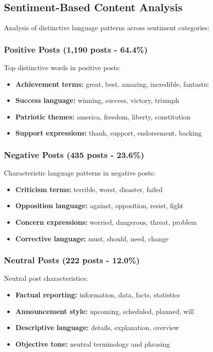 \documentclass[12pt,a4paper]{article}
\begin{document}
\subsection{Sentiment-Based Content Analysis}

Analysis of distinctive language patterns across sentiment categories:

\subsubsection{Positive Posts (1,190 posts - 64.4\%)}

Top distinctive words in positive posts:
\begin{itemize}
\item \textbf{Achievement terms:} great, best, amazing, incredible, fantastic
\item \textbf{Success language:} winning, success, victory, triumph
\item \textbf{Patriotic themes:} america, freedom, liberty, constitution
\item \textbf{Support expressions:} thank, support, endorsement, backing
\end{itemize}

\subsubsection{Negative Posts (435 posts - 23.6\%)}

Characteristic language patterns in negative posts:
\begin{itemize}
\item \textbf{Criticism terms:} terrible, worst, disaster, failed
\item \textbf{Opposition language:} against, opposition, resist, fight
\item \textbf{Concern expressions:} worried, dangerous, threat, problem
\item \textbf{Corrective language:} must, should, need, change
\end{itemize}

\subsubsection{Neutral Posts (222 posts - 12.0\%)}

Neutral post characteristics:
\begin{itemize}
\item \textbf{Factual reporting:} information, data, facts, statistics
\item \textbf{Announcement style:} upcoming, scheduled, planned, will
\item \textbf{Descriptive language:} details, explanation, overview
\item \textbf{Objective tone:} neutral terminology and phrasing
\end{itemize}
\end{document}
